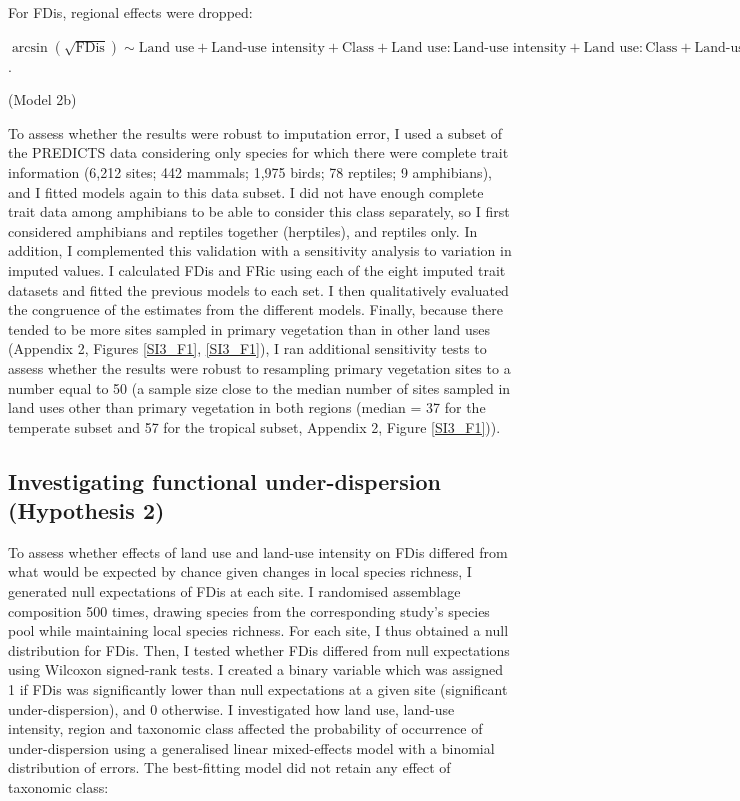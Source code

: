 For FDis, regional effects were dropped:
\begin{center}
$\arcsin(\sqrt{\text{FDis}})\sim \text{Land use} + \text{Land-use  intensity} + \text{Class} + \text{Land use}:\text{Land-use  intensity} + \text{Land use}:\text{Class} + \text{Land-use  intensity}:\text{Class}$.\\
\end{center}
\hspace*{\fill}(Model 2b)

To assess whether the results were robust to imputation error, I used a subset of the PREDICTS data considering only species for which there were complete trait information (6,212 sites; 442 mammals; 1,975 birds; 78 reptiles; 9 amphibians), and I fitted models again to this data subset. I did not have enough complete trait data among amphibians to be able to consider this class separately, so I first considered amphibians and reptiles together (herptiles), and reptiles only. In addition, I complemented this validation with a sensitivity analysis to variation in imputed values. I calculated FDis and FRic using each of the eight imputed trait datasets and fitted the previous models to each set. I then qualitatively evaluated the congruence of the estimates from the different models. Finally, because there tended to be more sites sampled in primary vegetation than in other land uses (Appendix 2, Figures \ref{SI3_F1}, \ref{SI3_F1}), I ran additional sensitivity tests to assess whether the results were robust to resampling primary vegetation sites to a number equal to 50 (a sample size close to the median number of sites sampled in land uses other than primary vegetation in both regions (median = 37 for the temperate subset and 57 for the tropical subset, Appendix 2, Figure \ref{SI3_F1})).


\subsection{Investigating functional under-dispersion (Hypothesis 2)}

To assess whether effects of land use and land-use  intensity on FDis differed from what would be expected by chance given changes in local species richness, I generated null expectations of FDis at each site. I randomised assemblage composition 500 times, drawing species from the corresponding study's species pool while maintaining local species richness. For each site, I thus obtained a null distribution for FDis. Then, I tested whether FDis differed from null expectations using Wilcoxon signed-rank tests. I created a binary variable which was assigned 1 if FDis was significantly lower than null expectations at a given site (significant under-dispersion), and 0 otherwise. I investigated how land use, land-use intensity, region and taxonomic class affected the probability of occurrence of under-dispersion using a generalised linear mixed-effects model with a binomial distribution of errors. The best-fitting model did not retain any effect of taxonomic class:

